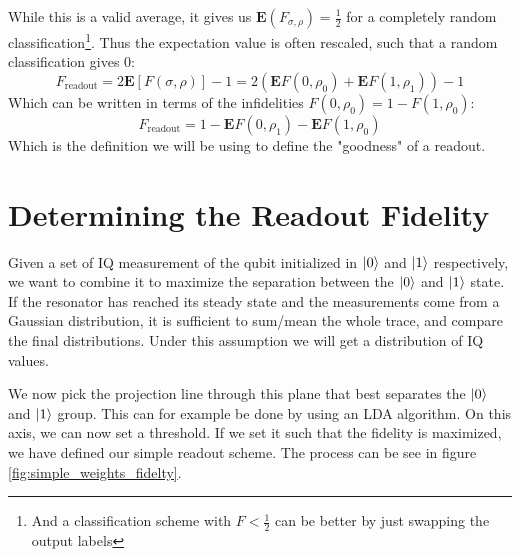 While this is a valid average, it gives us $\mathbf{E}(F_{\sigma, \rho}) = \frac12$ for a completely random classification\footnote{And a classification scheme with $F<\frac12$ can be better by just swapping the output labels}. Thus the expectation value is often rescaled, such that a random classification gives $0$:
\begin{equation}
    F_{\text{readout}} = 2 \mathbf{E}\left[F(\sigma, \rho)\right] - 1 = 2 ( \mathbf{E}F(0, \rho_0) + \mathbf{E}F(1, \rho_1) ) - 1 
\end{equation}
Which can be written in terms of the infidelities $F(0, \rho_0) = 1 - F(1, \rho_0)$:
\begin{equation}
    F_{\text{readout}} = 1 - \mathbf{E}F(0, \rho_1) - \mathbf{E}F(1, \rho_0)
\end{equation}
Which is the definition we will be using to define the "goodness" of a readout. 

\section{Determining the Readout Fidelity}
Given a set of IQ measurement of the qubit initialized in $\ket{0}$ and $\ket{1}$ respectively, we want to combine it to maximize the separation between the $\ket{0}$ and $\ket{1}$ state. If the resonator has reached its steady state and the measurements come from a Gaussian distribution, it is sufficient to sum/mean the whole trace, and compare the final distributions. Under this assumption we will get a distribution of IQ values. 

\begin{marginfigure}
    \centering
    \caption{Caption}
    \label{fig:enter-label}
\end{marginfigure}

We now pick the projection line through this plane that best separates the $\ket{0}$ and $\ket{1}$ group. This can for example be done by using an LDA algorithm. On this axis, we can now set a threshold. If we set it such that the fidelity is maximized, we have defined our simple readout scheme. The process can be see in figure \ref{fig:simple_weights_fidelty}.

\begin{figure*}
    \centering
    \caption{Caption}
    \label{fig:simple_weights_fidelty}
\end{figure*}

